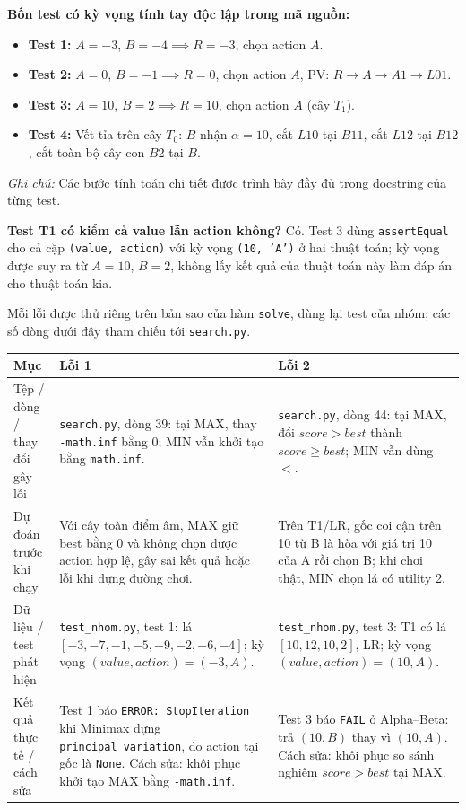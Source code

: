 \documentclass[11pt,a4paper]{article}
\newcommand{\head}[1]{\par\Needspace{3\baselineskip}\medskip{\large\sffamily\bfseries\color{Ink}#1}\par}
\begin{document}
\textbf{Bốn test có kỳ vọng tính tay độc lập trong mã nguồn:}
\begin{itemize}[leftmargin=6mm,itemsep=1pt,topsep=1pt]
\item \textbf{Test 1:} $A=-3$, $B=-4 \implies R=-3$, chọn action $A$.
\item \textbf{Test 2:} $A=0$, $B=-1 \implies R=0$, chọn action $A$, PV: $R \to A \to A1 \to L01$.
\item \textbf{Test 3:} $A=10$, $B=2 \implies R=10$, chọn action $A$ (cây $T_1$).
\item \textbf{Test 4:} Vết tỉa trên cây $T_0$: $B$ nhận $\alpha=10$, cắt $L10$ tại $B11$, cắt $L12$ tại $B12$, cắt toàn bộ cây con $B2$ tại $B$.
\end{itemize}
\textit{Ghi chú:} Các bước tính toán chi tiết được trình bày đầy đủ trong docstring của từng test.\par\smallskip
\textbf{Test T1 có kiểm cả value lẫn action không?} Có. Test 3 dùng \texttt{assertEqual} cho cả cặp \texttt{(value, action)} với kỳ vọng \texttt{(10, 'A')} ở hai thuật toán; kỳ vọng được suy ra từ $A=10$, $B=2$, không lấy kết quả của thuật toán này làm đáp án cho thuật toán kia.\par\medskip
\clearpage
\head{8. Hai lỗi nhóm đã phân tích}
Mỗi lỗi được thử riêng trên bản sao của hàm \texttt{solve}, dùng lại test của nhóm; các số dòng dưới đây tham chiếu tới \texttt{search.py}.\par\smallskip
\begingroup\footnotesize\renewcommand{\arraystretch}{1.45}\begin{tabularx}{\linewidth}{XXX}\toprule
\textbf{Mục} & \textbf{Lỗi 1} & \textbf{Lỗi 2}\\\midrule
Tệp / dòng / thay đổi gây lỗi & \texttt{search.py}, dòng 39: tại MAX, thay \texttt{-math.inf} bằng 0; MIN vẫn khởi tạo bằng \texttt{math.inf}. & \texttt{search.py}, dòng 44: tại MAX, đổi $\mathit{score}>\mathit{best}$ thành $\mathit{score}\ge\mathit{best}$; MIN vẫn dùng $<$.\\
Dự đoán trước khi chạy & Với cây toàn điểm âm, MAX giữ best bằng 0 và không chọn được action hợp lệ, gây sai kết quả hoặc lỗi khi dựng đường chơi. & Trên T1/LR, gốc coi cận trên 10 từ B là hòa với giá trị 10 của A rồi chọn B; khi chơi thật, MIN chọn lá có utility 2.\\
Dữ liệu / test phát hiện & \texttt{test\_nhom.py}, test 1: lá $[-3,-7,-1,-5,\allowbreak -9,-2,-6,-4]$; kỳ vọng $(\mathit{value},\mathit{action})=(-3,A)$. & \texttt{test\_nhom.py}, test 3: T1 có lá $[10,12,10,2]$, LR; kỳ vọng $(\mathit{value},\mathit{action})=(10,A)$.\\
Kết quả thực tế / cách sửa & Test 1 báo \texttt{ERROR: StopIteration} khi Minimax dựng \texttt{principal\_variation}, do action tại gốc là \texttt{None}. Cách sửa: khôi phục khởi tạo MAX bằng \texttt{-math.inf}. & Test 3 báo \texttt{FAIL} ở Alpha--Beta: trả $(10,B)$ thay vì $(10,A)$. Cách sửa: khôi phục so sánh nghiêm $\mathit{score}>\mathit{best}$ tại MAX.\\
\bottomrule\end{tabularx}\endgroup\par\medskip
\end{document}
